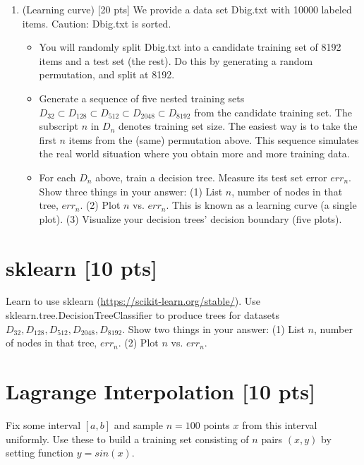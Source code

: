 \documentclass[a4paper]{article}
\theoremstyle{definition}
\begin{document}
\begin{enumerate}
\item (Learning curve)  [20 pts] We provide a data set Dbig.txt with 10000 labeled items.  Caution: Dbig.txt is sorted.
  \begin{itemize}
  
  \item You will randomly split Dbig.txt into a candidate training set of 8192 items and a test set (the rest).  Do this by generating a random permutation, and split at 8192.
  
  \item Generate a sequence of five nested training sets $D_{32} \subset D_{128} \subset D_{512} \subset D_{2048} \subset D_{8192}$ from the candidate training set.  The subscript $n$ in $D_n$ denotes training set size.  The easiest way is to take the first $n$ items from the (same) permutation above.  This sequence simulates the real world situation where you obtain more and more training data.
  
  \item For each $D_n$ above, train a decision tree.  Measure its test set error $err_n$.  Show three things in your answer: (1) List $n$, number of nodes in that tree, $err_n$. (2) Plot $n$ vs. $err_n$.  This is known as a learning curve (a single plot). (3) Visualize your decision trees' decision boundary (five plots). \\
  \end{itemize}
  
\end{enumerate}

\section{sklearn [10 pts]}
Learn to use sklearn (\url{https://scikit-learn.org/stable/}).
Use sklearn.tree.DecisionTreeClassifier to produce trees for datasets $D_{32}, D_{128}, D_{512}, D_{2048}, D_{8192}$.  Show two things in your answer: (1) List $n$, number of nodes in that tree, $err_n$. (2) Plot $n$ vs. $err_n$.

\section{Lagrange Interpolation [10 pts]}
Fix some interval $[a, b]$ and sample $n = 100$ points $x$ from this interval uniformly. Use these to build a training set consisting of $n$ pairs $(x, y)$ by setting function $y = sin(x)$. \\
\end{document}
